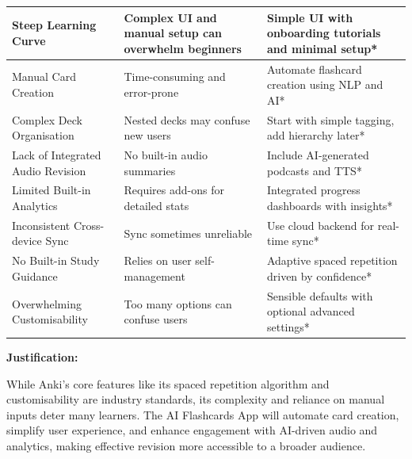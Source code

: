\documentclass[a4paper,12pt]{article}
\begin{document}
\begin{ThreePartTable}
\begin{longtable}{|p{3.5cm}|>{\raggedright\arraybackslash}p{5.5cm}|>{\raggedright\arraybackslash}p{5.5cm}|}
Steep Learning Curve & Complex UI and manual setup can overwhelm beginners & Simple UI with onboarding tutorials and minimal setup* \\
\hline
Manual Card Creation & Time-consuming and error-prone & Automate flashcard creation using NLP and AI* \\
\hline
Complex Deck Organisation & Nested decks may confuse new users & Start with simple tagging, add hierarchy later* \\
\hline
Lack of Integrated Audio Revision & No built-in audio summaries & Include AI-generated podcasts and TTS* \\
\hline
Limited Built-in Analytics & Requires add-ons for detailed stats & Integrated progress dashboards with insights* \\
\hline
Inconsistent Cross-device Sync & Sync sometimes unreliable & Use cloud backend for real-time sync* \\
\hline
No Built-in Study Guidance & Relies on user self-management & Adaptive spaced repetition driven by confidence* \\
\hline
Overwhelming Customisability & Too many options can confuse users & Sensible defaults with optional advanced settings* \\
\end{longtable}
\end{ThreePartTable}

\vspace{1em}

\textbf{Justification:} 

While Anki’s core features like its spaced repetition algorithm and customisability are industry standards, its complexity and reliance on manual inputs deter many learners. The AI Flashcards App will automate card creation, simplify user experience, and enhance engagement with AI-driven audio and analytics, making effective revision more accessible to a broader audience.
\end{document}
